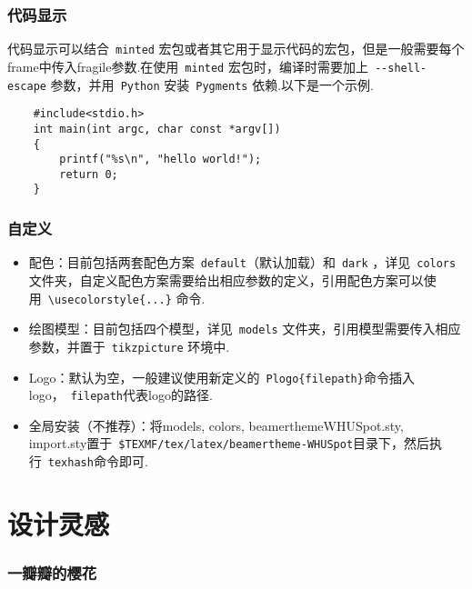 \documentclass{beamer}
\begin{document}
\begin{frame}[fragile]
    \frametitle{代码显示}
    代码显示可以结合~\verb|minted| 宏包或者其它用于显示代码的宏包，但是一般需要每个frame中传入fragile参数.在使用~\verb|minted| 宏包时，编译时需要加上~\verb|--shell-escape| 参数，并用~\verb|Python| 安装~\verb|Pygments| 依赖.以下是一个示例.
    \begin{verbatim}
    #include<stdio.h>
    int main(int argc, char const *argv[])
    {
        printf("%s\n", "hello world!");
        return 0;
    }
    \end{verbatim}
\end{frame}

\begin{frame}[fragile]
    \frametitle{自定义}
    \begin{itemize}
        \item 配色：目前包括两套配色方案~\verb|default|（默认加载）和~\verb|dark| ，详见~\verb|colors| 文件夹，自定义配色方案需要给出相应参数的定义，引用配色方案可以使用~\verb|\usecolorstyle{...}| 命令.
        \item 绘图模型：目前包括四个模型，详见~\verb|models| 文件夹，引用模型需要传入相应参数，并置于~\verb|tikzpicture| 环境中.
        \item Logo：默认为空，一般建议使用新定义的~\verb|Plogo{filepath}|命令插入logo，~\verb|filepath|代表logo的路径.
        \item 全局安装（不推荐）：将models, colors, beamerthemeWHUSpot.sty, import.sty置于~\verb|$TEXMF/tex/latex/beamertheme-WHUSpot|目录下，然后执行~\verb|texhash|命令即可.
    \end{itemize}
\end{frame}

\section{设计灵感}

\begin{frame}
    \frametitle{一瓣瓣的樱花}
    \begin{figure}
    \centering
    \end{figure}
\end{frame}
\end{document}
